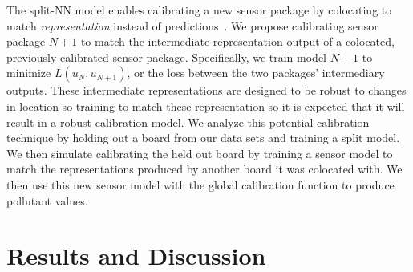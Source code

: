 \documentclass[journal abbreviation, manuscript]{copernicus}
\begin{document}
The split-NN model enables calibrating a new sensor package by colocating to match \textit{representation} instead of predictions~\citep{Goodfellow-et-al-2016}.  We propose calibrating sensor package $N+1$ to match the intermediate representation output of a colocated, previously-calibrated sensor package. Specifically, we train model $N + 1$ to minimize $L(u_N, u_{N + 1})$, or the loss between the two packages' intermediary outputs. These intermediate representations are designed to be robust to changes in location so training to match these representation so it is expected that it will result in a robust calibration model. We analyze this potential calibration technique by holding out a board from our data sets and training a split model. We then simulate calibrating the held out board by training a sensor model to match the representations produced by another board it was colocated with. We then use this new sensor model with the global calibration function to produce pollutant values. 


\section{Results and Discussion}
\end{document}
